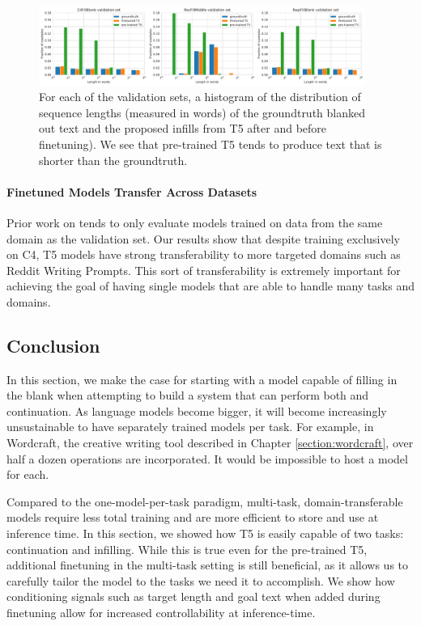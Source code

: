 \begin{figure}[tbp]
    \centering
    \includegraphics[width=0.95\textwidth]{figures/t5_lengths}
    \caption{For each of the \FitB{} validation sets, a histogram of the distribution of sequence lengths (measured in words) of the {groundtruth} blanked out text and the proposed infills from T5 {after} and {before} finetuning). We see that pre-trained T5 tends to produce text that is shorter than the groundtruth.}
    \label{fig:t5_lengths}
\end{figure}

\paragraph{Finetuned Models Transfer Across Datasets}
Prior work on \FitB{} tends to only evaluate models trained on data from the same domain as the validation set.
Our results show that despite training exclusively on C4, T5 models have strong transferability to more targeted domains such as Reddit Writing Prompts.
This sort of transferability is extremely important for achieving the goal of having single models that are able to handle many tasks and domains.

\subsection{Conclusion}
In this section, we make the case for starting with a model capable of filling in the blank when attempting to build a system that can perform both \FitB{} and continuation.
As language models become bigger, it will become increasingly unsustainable to have separately trained models per task.
For example, in Wordcraft, the creative writing tool described in Chapter \ref{section:wordcraft}, over half a dozen operations are incorporated.
It would be impossible to host a model for each.

Compared to the one-model-per-task paradigm, multi-task, domain-transferable models require less total training and are more efficient to store and use at inference time.
In this section, we showed how T5 is easily capable of two tasks: continuation and infilling.
While this is true even for the pre-trained T5, additional finetuning in the multi-task setting is still beneficial, as it allows us to carefully tailor the model to the tasks we need it to accomplish.
We show how conditioning signals such as target length and goal text when added during finetuning allow for increased controllability at inference-time.

